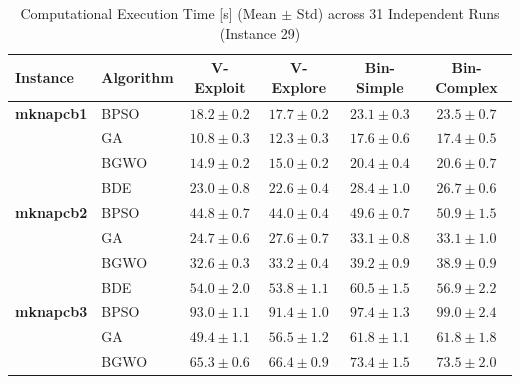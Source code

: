 \begin{table}[htbp]
  \centering
  \small
  \caption{Computational Execution Time [s] (Mean $\pm$ Std) across 31 Independent Runs (Instance 29)}
  \label{tab:computational_cost_inst29}
  \begin{tabular*}{\textwidth}{@{\extracolsep{\fill}}llcccc@{}}
    \toprule
    \textbf{Instance} & \textbf{Algorithm} & \textbf{V-Exploit} & \textbf{V-Explore} & \textbf{Bin-Simple} & \textbf{Bin-Complex} \\
    \midrule
    \textbf{mknapcb1}  & BPSO  &           $18.2 \pm 0.2$ &  $\mathbf{17.7 \pm 0.2}$ &           $23.1 \pm 0.3$ &           $23.5 \pm 0.7$ \\
                       & GA    &  $\mathbf{10.8 \pm 0.3}$ &           $12.3 \pm 0.3$ &           $17.6 \pm 0.6$ &           $17.4 \pm 0.5$ \\
                       & BGWO  &  $\mathbf{14.9 \pm 0.2}$ &           $15.0 \pm 0.2$ &           $20.4 \pm 0.4$ &           $20.6 \pm 0.7$ \\
                       & BDE   &           $23.0 \pm 0.8$ &  $\mathbf{22.6 \pm 0.4}$ &           $28.4 \pm 1.0$ &           $26.7 \pm 0.6$ \\
    \midrule
    \textbf{mknapcb2}  & BPSO  &           $44.8 \pm 0.7$ &  $\mathbf{44.0 \pm 0.4}$ &           $49.6 \pm 0.7$ &           $50.9 \pm 1.5$ \\
                       & GA    &  $\mathbf{24.7 \pm 0.6}$ &           $27.6 \pm 0.7$ &           $33.1 \pm 0.8$ &           $33.1 \pm 1.0$ \\
                       & BGWO  &  $\mathbf{32.6 \pm 0.3}$ &           $33.2 \pm 0.4$ &           $39.2 \pm 0.9$ &           $38.9 \pm 0.9$ \\
                       & BDE   &           $54.0 \pm 2.0$ &  $\mathbf{53.8 \pm 1.1}$ &           $60.5 \pm 1.5$ &           $56.9 \pm 2.2$ \\
    \midrule
    \textbf{mknapcb3}  & BPSO  &           $93.0 \pm 1.1$ &  $\mathbf{91.4 \pm 1.0}$ &           $97.4 \pm 1.3$ &           $99.0 \pm 2.4$ \\
                       & GA    &  $\mathbf{49.4 \pm 1.1}$ &           $56.5 \pm 1.2$ &           $61.8 \pm 1.1$ &           $61.8 \pm 1.8$ \\
                       & BGWO  &  $\mathbf{65.3 \pm 0.6}$ &           $66.4 \pm 0.9$ &           $73.4 \pm 1.5$ &           $73.5 \pm 2.0$ \\

\end{tabular*}
\end{table}
